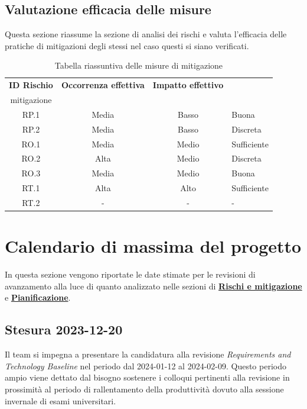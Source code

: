 \documentclass[10pt, a4paper]{article}
\begin{document}
{{{{{\subsection{Valutazione efficacia delle misure}
Questa sezione riassume la sezione di analisi dei rischi e valuta l'efficacia delle pratiche di mitigazioni degli stessi nel caso questi si siano verificati.\\
{\renewcommand{\arraystretch}{1.5}
\begin{table}[H]
\begin{tabularx}{\textwidth}{c|c|c|X}
\textbf{ID Rischio} & \textbf{Occorrenza effettiva} & \textbf{Impatto effettivo} & \textbf{\quantities{Efficacia misure di \\mitigazione}} \\
\hline
RP.1 & Media & Basso & Buona\\
\hline
RP.2 & Media & Basso & Discreta \\
\hline
RO.1 & Media & Medio & Sufficiente\\
\hline
RO.2 & Alta & Medio & Discreta\\
\hline
RO.3 & Media & Medio & Buona\\
\hline
RT.1 & Alta & Alto & Sufficiente\\
\hline
RT.2 & - & - & -\\


\end{tabularx}
\caption{Tabella riassuntiva delle misure di mitigazione}
\end{table}

\newpage
\section{Calendario di massima del progetto}
In questa sezione vengono riportate le date stimate per le revisioni di avanzamento alla luce di quanto analizzato nelle sezioni di \hyperref[section:Rischi]{\textbf{Rischi e mitigazione}} e \hyperref[section:Pianificazione]{\textbf{Pianificazione}}.

\subsection{Stesura 2023-12-20}
Il team si impegna a presentare la candidatura alla revisione \textit{Requirements and Technology Baseline} nel periodo dal 2024-01-12 al 2024-02-09. Questo periodo ampio viene dettato dal bisogno sostenere i colloqui pertinenti alla revisione in prossimità al periodo di rallentamento della produttività dovuto alla sessione invernale di esami universitari. \\

}}}}}}
\end{document}

